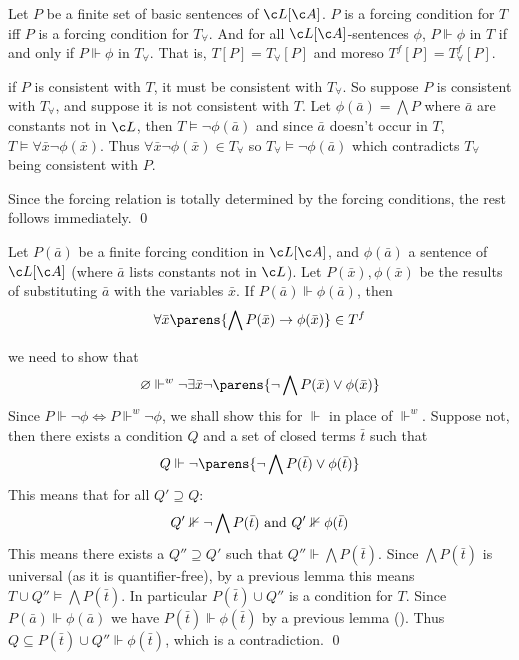 \blemm[name=lemm3.9]

    Let $P$ be a finite set of basic sentences of $\c L[\c A]$.
    $P$ is a forcing condition for $T$ iff $P$ is a forcing condition for $T_\forall$.
    And for all $\c L[\c A]$-sentences $\phi$, $P\Vdash\phi$ in $T$ if and only if $P\Vdash\phi$ in $T_\forall$.
    That is, $T[P]=T_\forall[P]$ and moreso $T^f[P]=T_\forall^f[P]$.

\elemm

\Proof if $P$ is consistent with $T$, it must be consistent with $T_\forall$.
So suppose $P$ is consistent with $T_\forall$, and suppose it is not consistent with $T$.
Let $\phi(\bar a)=\bigwedge P$ where $\bar a$ are constants not in $\c L$, then $T\vDash\neg\phi(\bar a)$ and since $\bar a$ doesn't occur in $T$, $T\vDash\forall\bar x\neg\phi(\bar x)$.
Thus $\forall\bar x\neg\phi(\bar x)\in T_\forall$ so $T_\forall\vDash\neg\phi(\bar a)$ which contradicts $T_\forall$ being consistent with $P$.

Since the forcing relation is totally determined by the forcing conditions, the rest follows immediately.
\qed

\blemm[name=condforcompanion]

    Let $P(\bar a)$ be a finite forcing condition in $\c L[\c A]$, and $\phi(\bar a)$ a sentence of $\c L[\c A]$ (where $\bar a$ lists constants not in $\c L$).
    Let $P(\bar x),\phi(\bar x)$ be the results of substituting $\bar a$ with the variables $\bar x$.
    If $P(\bar a)\Vdash\phi(\bar a)$, then
    $$ \forall\bar x\parens{\bigwedge P(\bar x)\to\phi(\bar x)} \in T^f $$

\elemm

\Proof we need to show that
$$ \varnothing\Vdash^w\neg\exists\bar x\neg\parens{\neg\bigwedge P(\bar x)\lor\phi(\bar x)} $$
Since $P\Vdash\neg\phi\iff P\Vdash^w\neg\phi$, we shall show this for $\Vdash$ in place of $\Vdash^w$.
Suppose not, then there exists a condition $Q$ and a set of closed terms $\bar t$ such that
$$ Q\Vdash\neg\parens{\neg\bigwedge P(\bar t)\lor\phi(\bar t)} $$
This means that for all $Q'\supseteq Q$:
$$ Q'\nVdash\neg\bigwedge P(\bar t)\hbox{ and } Q'\nVdash\phi(\bar t) $$
This means there exists a $Q''\supseteq Q'$ such that $Q''\Vdash\bigwedge P(\bar t)$.
Since $\bigwedge P(\bar t)$ is universal (as it is quantifier-free), by a previous lemma this means $T\cup Q''\vDash\bigwedge P(\bar t)$.
In particular $P(\bar t)\cup Q''$ is a condition for $T$.
Since $P(\bar a)\Vdash\phi(\bar a)$ we have $P(\bar t)\Vdash\phi(\bar t)$ by a previous lemma ().
Thus $Q\subseteq P(\bar t)\cup Q''\Vdash\phi(\bar t)$, which is a contradiction.
\qed

